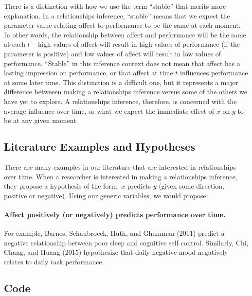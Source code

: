 \documentclass[english,,man]{apa6}
\let\oldparagraph\paragraph
\renewcommand{\paragraph}[1]{\oldparagraph{#1}\mbox{}}
\theoremstyle{definition}
\theoremstyle{definition}
\theoremstyle{definition}
\theoremstyle{remark}
\begin{document}
There is a distinction with how we use the term \enquote{stable} that
merits more explanation. In a relationships inference, \enquote{stable}
means that we expect the parameter value relating affect to performance
to be the same at each moment. In other words, the relationship between
affect and performance will be the same at each \(t\) -- high values of
affect will result in high values of performance (if the parameter is
positive) and low values of affect will result in low values of
performance. \enquote{Stable} in this inference context does not mean
that affect has a lasting impression on performance, or that affect at
time \(t\) influences performance at some later time. This distinction
is a difficult one, but it represents a major difference betweeen making
a relationships inference versus some of the others we have yet to
explore. A relationships inference, therefore, is concerned with the
average influence over time, or what we expect the immediate effect of
\(x\) on \(y\) to be at any given moment.

\hypertarget{literature-examples-and-hypotheses}{%
\subsection{Literature Examples and
Hypotheses}\label{literature-examples-and-hypotheses}}

There are many examples in our literature that are interested in
relationships over time. When a researcher is interested in making a
relationships inference, they propose a hypothesis of the form: \(x\)
predicts \(y\) (given some direction, positive or negative). Using our
generic variables, we would propose:

\hypertarget{affect-positively-or-negatively-predicts-performance-over-time.}{%
\paragraph{Affect positively (or negatively) predicts performance over
time.}\label{affect-positively-or-negatively-predicts-performance-over-time.}}

\noindent For example, Barnes, Schaubroeck, Huth, and Ghumman (2011)
predict a negative relationship between poor sleep and cognitive self
control. Similarly, Chi, Chang, and Huang (2015) hypothesize that daily
negative mood negatively relates to daily task performance.

\hypertarget{code}{%
\subsection{Code}\label{code}}
\end{document}
